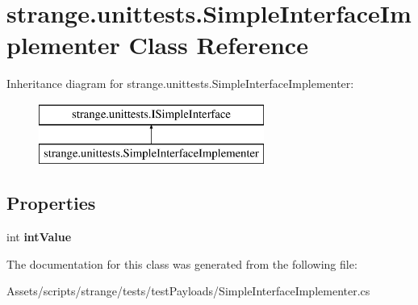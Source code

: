 \hypertarget{classstrange_1_1unittests_1_1_simple_interface_implementer}{\section{strange.\-unittests.\-Simple\-Interface\-Implementer Class Reference}
\label{classstrange_1_1unittests_1_1_simple_interface_implementer}
}
Inheritance diagram for strange.\-unittests.\-Simple\-Interface\-Implementer\-:\begin{figure}[H]
\begin{center}
\leavevmode
\includegraphics[height=2.000000cm]{classstrange_1_1unittests_1_1_simple_interface_implementer}
\end{center}
\end{figure}
\subsection*{Properties}
\begin{DoxyCompactItemize}
\item 
\hypertarget{classstrange_1_1unittests_1_1_simple_interface_implementer_a348f244c4417f59edf0f4c82431cd599}{int {\bfseries int\-Value}}\label{classstrange_1_1unittests_1_1_simple_interface_implementer_a348f244c4417f59edf0f4c82431cd599}

\end{DoxyCompactItemize}


The documentation for this class was generated from the following file\-:\begin{DoxyCompactItemize}
\item 
Assets/scripts/strange/tests/test\-Payloads/Simple\-Interface\-Implementer.\-cs\end{DoxyCompactItemize}
